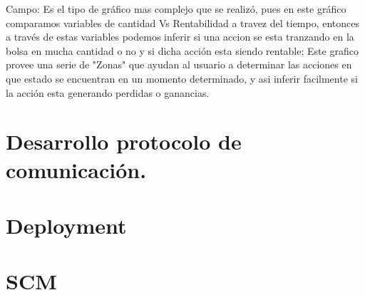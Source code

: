 Campo: Es el tipo de gráfico mas complejo que se realizó, pues en este gráfico comparamos variables de cantidad Vs Rentabilidad a travez del tiempo, entonces a través de estas variables podemos inferir si una accion se esta tranzando en la bolsa en mucha cantidad o no y si dicha acción esta siendo rentable; Este grafico provee una serie de "Zonas" que ayudan al usuario a determinar las acciones en que estado se encuentran en un momento determinado, y asi inferir facilmente si la acción esta generando perdidas o ganancias.

 

\section{Desarrollo protocolo de comunicación.}

\section{Deployment}

\section{SCM}